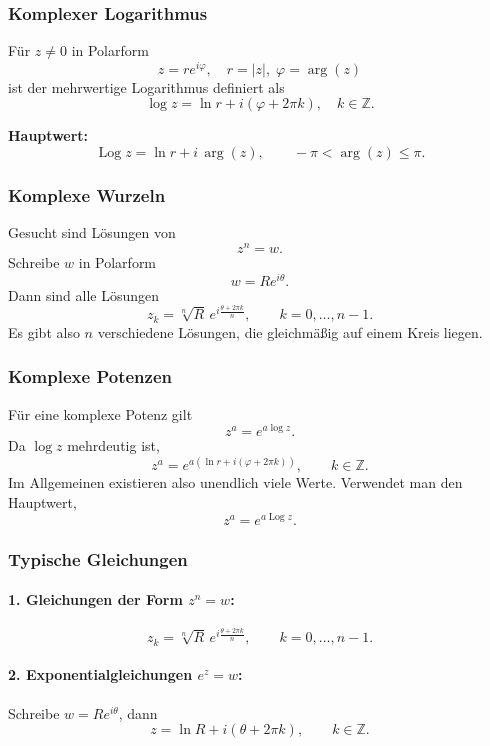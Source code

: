 \documentclass[9pt,a4paper]{article}
\begin{document}
    \subsubsection{Komplexer Logarithmus}
    Für $z \neq 0$ in Polarform
    \[
    z = re^{i\varphi}, \quad r = |z|, \;\varphi = \arg(z)
    \]
    ist der mehrwertige Logarithmus definiert als
    \[
    \log z = \ln r + i(\varphi + 2\pi k), \quad k \in \mathbb{Z}.
    \]
    
    \textbf{Hauptwert:}
    \[
    \operatorname{Log}z = \ln r + i\,\arg(z), \qquad -\pi < \arg(z)\le \pi.
    \]
    
    
    \subsubsection{Komplexe Wurzeln}
    Gesucht sind Lösungen von
    \[
    z^n = w.
    \]
    Schreibe $w$ in Polarform
    \[
    w = Re^{i\theta}.
    \]
    Dann sind alle Lösungen
    \[
    z_k = \sqrt[n]{R}\, e^{i\frac{\theta + 2\pi k}{n}}, \qquad k=0,\dots,n-1.
    \]
    Es gibt also $n$ verschiedene Lösungen, die gleichmäßig auf einem Kreis liegen.
    
    
    \subsubsection{Komplexe Potenzen}
    Für eine komplexe Potenz gilt
    \[
    z^a = e^{a\log z}.
    \]
    Da $\log z$ mehrdeutig ist,
    \[
    z^a = e^{a(\ln r + i(\varphi + 2\pi k))}, \qquad k\in\mathbb{Z}.
    \]
    Im Allgemeinen existieren also unendlich viele Werte.
    Verwendet man den Hauptwert,
    \[
    z^a = e^{a\operatorname{Log}z}.
    \]
    
    
    \subsubsection{Typische Gleichungen}
    
    \paragraph{1. Gleichungen der Form $z^n = w$:}
    \[
    z_k = \sqrt[n]{R}\, e^{i\frac{\theta + 2\pi k}{n}}, \qquad k=0,\dots,n-1.
    \]
    
    \paragraph{2. Exponentialgleichungen $e^z = w$:}
    Schreibe $w = Re^{i\theta}$, dann
    \[
    z = \ln R + i(\theta + 2\pi k), \qquad k\in\mathbb{Z}.
    \]
    
\end{document}
